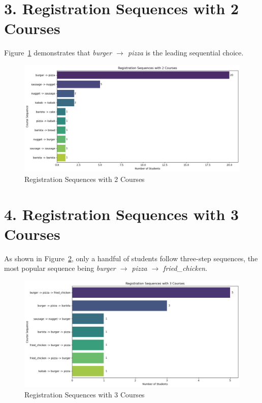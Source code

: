 \documentclass[12pt,a4paper]{article}
\begin{document}
\section*{3. Registration Sequences with 2 Courses}
Figure~\ref{fig:seq2} demonstrates that \textit{burger $\rightarrow$ pizza} is the leading sequential choice.

\begin{figure}[h!]
    \centering
    \includegraphics[width=1\textwidth]{Registration Sequences with 2 Courses.png}
    \caption{Registration Sequences with 2 Courses}
    \label{fig:seq2}
\end{figure}

\section*{4. Registration Sequences with 3 Courses}
As shown in Figure~\ref{fig:seq3}, only a handful of students follow three-step sequences, the most popular sequence being \textit{burger $\rightarrow$ pizza $\rightarrow$ fried\_chicken}.

\begin{figure}[h!]
    \centering
    \includegraphics[width=1\textwidth]{Registration Sequences with 3 Courses.png}
    \caption{Registration Sequences with 3 Courses}
    \label{fig:seq3}
\end{figure}
\end{document}
